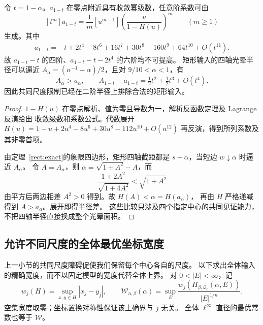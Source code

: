 \begin{corollary}[全阶反演与公共尺度的损失]\label{com:orders}
令 $t=1-\alpha$。$a_{1-t}$ 在零点附近具有收敛幂级数，任意阶系数可由
\[
 [t^m]a_{1-t}=\frac1m[u^{m-1}]
 \left(\frac{u}{1-H(u)}\right)^m\qquad(m\ge1)
\]
生成。其中
\begin{align*}
 a_{1-t}={}&t+2t^4-8t^6+16t^7+30t^8-160t^9+64t^{10}+O(t^{11}).
\end{align*}
故 $a_{1-t}-t$ 的四阶、$a_{1-t}-t-2t^4$ 的六阶均不可提高。
矩形输入的四轴光晕半径可以逼近
$A_\alpha=(\alpha^{-1}-\alpha)/2$，且对 $9/10<\alpha<1$，有
\[
 A_\alpha>a_\alpha,\qquad
 A_{1-t}-a_{1-t}=\tfrac12t^2+\tfrac12t^3+O(t^4).
\]
因此共同尺度限制已经在二阶半径上排除合法的矩形输入。
\end{corollary}
\begin{proof}
$1-H(u)$ 在零点解析、值为零且导数为一，解析反函数定理及 Lagrange 反演给出
收敛级数和系数公式。代数展开 $H(u)=1-u+2u^4-8u^6+30u^8-112u^{10}+O(u^{12})$
再反演，得到所列系数及其非零首项。

由定理~\ref{rect:exact}的象限四边形，矩形四轴截距都是
$s-\alpha$，当短边 $w\downarrow\alpha$ 时逼近 $A_\alpha$。
令 $A=A_\alpha$，则 $\alpha=\sqrt{1+A^2}-A$，而
\[
 \frac{1+2A^2}{\sqrt{1+4A^2}}<\sqrt{1+A^2}
\]
由平方后两边相差 $A^2>0$ 得到。故 $H(A)<\alpha=H(a_\alpha)$，
再由 $H$ 严格递减得到 $A>a_\alpha$。展开即得半径差。
这些比较只涉及四个指定中心的共同见证能力，不把四轴半径直接换成整个光晕面积。
\end{proof}

\subsection{允许不同尺度的全体最优坐标宽度}\label{wid:section}

上一小节的共同尺度障碍促使我们保留每个中心各自的尺度。
以下求出全体输入的精确宽度，而不以固定模型的宽度代替全体上界。
对 $0<|E|<\infty$，记
\[
 w_j(H)=\sup_{x,y\in H}|x_j-y_j|,\qquad
 \mathcal W_{n,\beta}(\alpha)
 =\sup_E\frac{w_j(H_{\beta,\mathcal Q_c}(\alpha,E))}{|E|^{1/n}}.
\]
空集宽度取零；坐标置换对称性保证该上确界与 $j$ 无关。
全体 $\ell^\infty$ 直径的最优常数也等于 $\mathcal W$。

